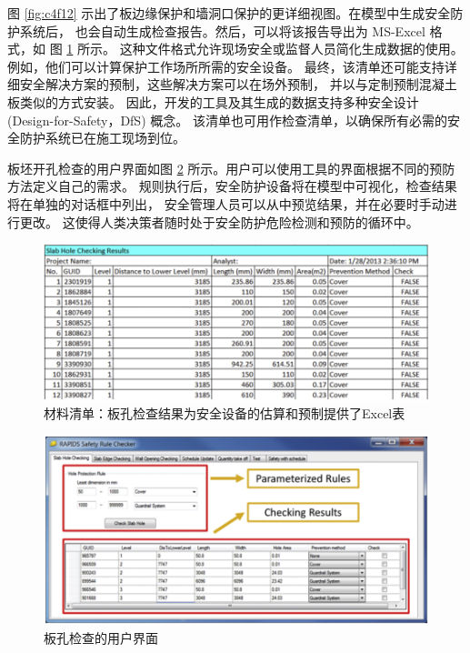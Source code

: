 图 \ref{fig:c4f12} 示出了板边缘保护和墙洞口保护的更详细视图。在模型中生成安全防护系统后，
也会自动生成检查报告。然后，可以将该报告导出为 MS-Excel 格式，如 图 \ref{fig:c4f13} 所示。
这种文件格式允许现场安全或监督人员简化生成数据的使用。
例如，他们可以计算保护工作场所所需的安全设备。
最终，该清单还可能支持详细安全解决方案的预制，这些解决方案可以在场外预制，
并以与定制预制混凝土板类似的方式安装。
因此，开发的工具及其生成的数据支持多种安全设计 (Design-for-Safety，DfS) 概念。
该清单也可用作检查清单，以确保所有必需的安全防护系统已在施工现场到位。

板坯开孔检查的用户界面如图 \ref{fig:c4f14} 所示。用户可以使用工具的界面根据不同的预防方法定义自己的需求。
规则执行后，安全防护设备将在模型中可视化，检查结果将在单独的对话框中列出，
安全管理人员可以从中预览结果，并在必要时手动进行更改。
这使得人类决策者随时处于安全防护危险检测和预防的循环中。

\begin{figure}[thbp!]
    \centering
    \includegraphics[width=1\linewidth]{res/c4f13.png}
    \caption{材料清单：板孔检查结果为安全设备的估算和预制提供了Excel表}
    \label{fig:c4f13}
\end{figure}

\begin{figure}[thbp!]
    \centering
    \includegraphics[width=1\linewidth]{res/c4f14.png}
    \caption{板孔检查的用户界面}
    \label{fig:c4f14}
\end{figure}

